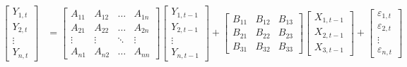\documentclass[a4paper,12pt]{article}
\begin{document}
\begin{equation}
\label{eq:var_model}
\begin{aligned}
\begin{bmatrix}
Y_{1,t} \\
Y_{2,t} \\
\vdots \\
Y_{n,t}
\end{bmatrix} &=
\begin{bmatrix}
A_{11} & A_{12} & \dots & A_{1n} \\
A_{21} & A_{22} & \dots & A_{2n} \\
\vdots & \vdots & \ddots & \vdots \\
A_{n1} & A_{n2} & \dots & A_{nn}
\end{bmatrix}
\begin{bmatrix}
Y_{1,t-1} \\
Y_{2,t-1} \\
\vdots \\
Y_{n,t-1}
\end{bmatrix} +
\begin{bmatrix}
B_{11} & B_{12} & B_{13} \\
B_{21} & B_{22} & B_{23} \\
B_{31} & B_{32} & B_{33}
\end{bmatrix}
\begin{bmatrix}
X_{1,t-1} \\
X_{2,t-1} \\
X_{3,t-1}
\end{bmatrix} +
\begin{bmatrix}
\varepsilon_{1,t} \\
\varepsilon_{2,t} \\
\vdots \\
\varepsilon_{n,t}
\end{bmatrix}
\end{aligned}
\end{equation}
\end{document}
